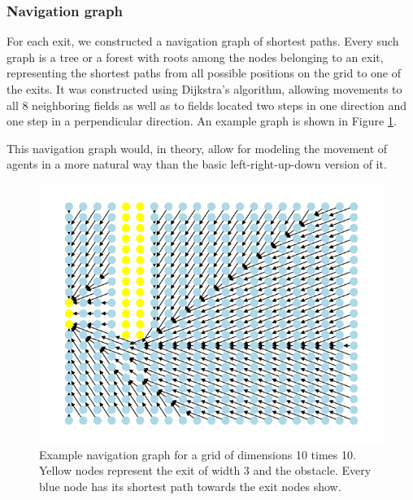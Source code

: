 \documentclass[9pt]{pnas-new}
\begin{document}
\subsubsection{Navigation graph}

For each exit, we constructed a navigation graph of shortest paths. Every such graph is a tree or a forest with roots among the nodes belonging to an exit, representing the shortest paths from all possible positions on the grid to one of the exits. It was constructed using Dijkstra's algorithm, allowing movements to all 8 neighboring fields as well 
as to fields located two steps in one direction and one step in a perpendicular direction.
An example graph is shown in Figure \ref{fig:spgraph}.

This navigation graph would, in theory, allow for modeling the movement of agents in a more natural way than the basic left-right-up-down version of it.

\begin{figure}[h!]
    \centering
    \includegraphics[width=0.5\linewidth]{fig/dijkstra.png}
    \caption{Example navigation graph for a grid of dimensions 10 times 10. Yellow nodes represent the exit of width 3 and the obstacle. Every blue node has its shortest path towards the exit nodes show.}
    \label{fig:spgraph}
\end{figure}
\end{document}
